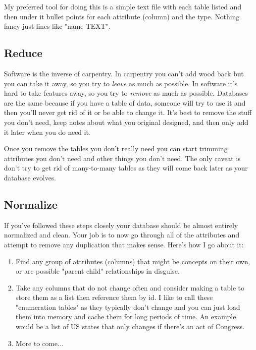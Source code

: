 My preferred tool for doing this is a simple text file with each table listed and then under it 
bullet points for each attribute (column) and the type.  Nothing fancy just lines like "name TEXT".


\subsection{Reduce}

Software is the inverse of carpentry.  In carpentry you can't add wood back but you can take it away,
so you try to \emph{leave} as much as possible.  In software it's hard to take features away, so you try
to \emph{remove} as much as possible.  Databases are the same because if you have a table of data,
someone will try to use it and then you'll never get rid of it or be able to change it.  It's best
to remove the stuff you don't need, keep notes about what you original designed, and then only add
it later when you do need it.

Once you remove the tables you don't really need you can start trimming attributes you don't need
and other things you don't need.  The only caveat is don't try to get rid of many-to-many tables
as they will come back later as your database evolves.

\subsection{Normalize}

If you've followed these steps closely your database should be almost entirely normalized and
clean.  Your job is to now go through all of the attributes and attempt to remove any duplication
that makes sense.  Here's how I go about it:

\begin{enumerate}
\item Find any group of attributes (columns) that might be concepts on their own, or are
    possible "parent child" relationships in disguise.
\item Take any columns that do not change often and consider making a table to
    store them as a list then reference them by id.  I like to call these
    "enumeration tables" as they typically don't change and you can just load them
    into memory and cache them for long periods of time.  An example would be a
    list of US states that only changes if there's an act of Congress.
\item More to come...
\end{enumerate}


